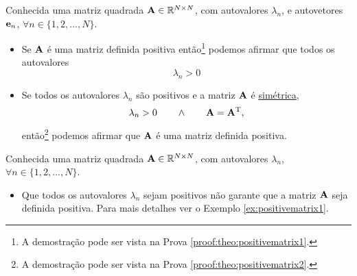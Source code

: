\begin{theorem}\label{theo:positivematrix1}
Conhecida uma matriz quadrada $\MATRIX{A} \in \mathbb{R}^{N \times N}$, com  autovalores $\lambda_n$,
e autovetores $\VECTOR{e}_n$, $\forall n \in \{1, 2, ..., N\}$.
\begin{itemize}
\item Se $\MATRIX{A}$ é uma matriz definida positiva então\footnote{\label{foot:theo:positivematrix1}A
demostração pode ser vista na Prova \ref{proof:theo:positivematrix1}.}  
podemos afirmar que todos os autovalores 
\begin{equation}
\lambda_n > 0
\end{equation}
\item Se todos os autovalores $\lambda_n$ são positivos e a matriz $\MATRIX{A}$ é \hyperref[def:symmetricmatrix0]{simétrica},
\begin{equation}
\lambda_n > 0 \qquad \wedge \qquad \MATRIX{A}=\MATRIX{A}^{\transpose},
\end{equation}
 então\footnote{A
demostração pode ser vista na Prova \ref{proof:theo:positivematrix2}.} 
podemos afirmar que $\MATRIX{A}$ é uma matriz definida positiva.
\end{itemize}
\end{theorem}

\begin{tcbattention}
Conhecida uma matriz quadrada $\MATRIX{A} \in \mathbb{R}^{N \times N}$, 
com  autovalores $\lambda_n$, $\forall n \in \{1, 2, ..., N\}$.
\begin{itemize}
\item Que todos os autovalores $\lambda_n$ sejam positivos não garante que a matriz $\MATRIX{A}$
seja definida positiva. Para mais detalhes ver o Exemplo \ref{ex:positivematrix1}.
\end{itemize}
\end{tcbattention}

